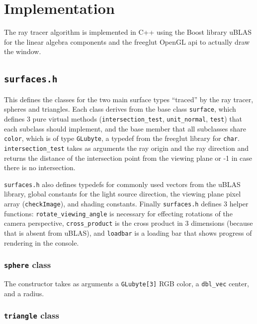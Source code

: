\documentclass[12pt]{article}
\begin{document}
\section{Implementation}

The ray tracer algorithm is implemented in C++ using the Boost library uBLAS \cite{ublas} for the linear algebra components and the freeglut OpenGL api to actually draw the window.

\subsection{\texttt{surfaces.h}}

This defines the classes for the two main surface types ``traced'' by the ray tracer, spheres and triangles. Each class derives from the base class \texttt{surface}, which defines 3 pure virtual methods (\texttt{intersection\_test}, \texttt{unit\_normal}, \texttt{test}) that each subclass should implement, and the base member that all subclasses share \texttt{color}, which is of type \texttt{GLubyte}, a typedef from the freeglut library for \texttt{char}. \texttt{intersection\_test} takes as arguments the ray origin and the ray direction and returns the distance of the intersection point from the viewing plane or -1 in case there is no intersection. 

\texttt{surfaces.h} also defines typedefs for commonly used vectors from the uBLAS library, global constants for the light source direction, the viewing plane pixel array (\texttt{checkImage}), and shading constants. Finally \texttt{surfaces.h} defines 3 helper functions: \texttt{rotate\_viewing\_angle} is necessary for effecting rotations of the camera perspective, \texttt{cross\_product} is the cross product in 3 dimensions (because that is absent from uBLAS), and \texttt{loadbar} is a loading bar that shows progress of rendering in the console.

\subsubsection{\texttt{sphere} class}

The constructor takes as arguments a \texttt{GLubyte[3]} RGB color, a \texttt{dbl\_vec} center, and a radius.

\subsubsection{\texttt{triangle} class}
\end{document}
